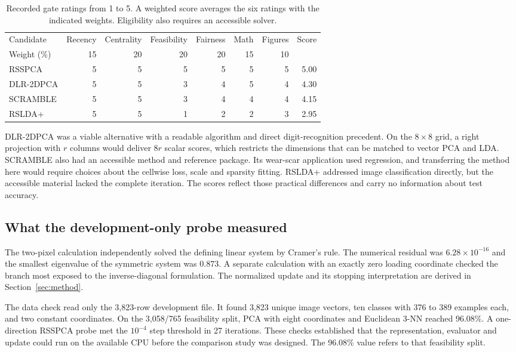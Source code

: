 \documentclass[11pt,a4paper]{article}
\begin{document}
\begin{table}[H]\small\centering
\caption{Recorded gate ratings from 1 to 5. A weighted score averages the six ratings with the indicated weights. Eligibility also requires an accessible solver.}
\label{tab:gate-scores}
\setlength{\tabcolsep}{5pt}
\begin{tabular}{@{}lrrrrrrr@{}}
\toprule
Candidate & Recency & Centrality & Feasibility & Fairness & Math & Figures & Score\\
Weight (\%) & 15 & 20 & 20 & 20 & 15 & 10 & \\
\midrule
RSSPCA & 5 & 5 & 5 & 5 & 5 & 5 & 5.00\\
DLR-2DPCA & 5 & 5 & 3 & 4 & 5 & 4 & 4.30\\
SCRAMBLE & 5 & 5 & 3 & 4 & 4 & 4 & 4.15\\
RSLDA+ & 5 & 5 & 1 & 2 & 2 & 3 & 2.95\\
\bottomrule
\end{tabular}
\end{table}

DLR-2DPCA was a viable alternative with a readable algorithm and direct digit-recognition precedent. On the $8\times8$ grid, a right projection with $r$ columns would deliver $8r$ scalar scores, which restricts the dimensions that can be matched to vector PCA and LDA. SCRAMBLE also had an accessible method and reference package. Its wear-scar application used regression, and transferring the method here would require choices about the cellwise loss, scale and sparsity fitting. RSLDA+ addressed image classification directly, but the accessible material lacked the complete iteration. The scores reflect those practical differences and carry no information about test accuracy.

\subsection{What the development-only probe measured}

The two-pixel calculation independently solved the defining linear system by Cramer's rule. The numerical residual was $6.28\times10^{-16}$ and the smallest eigenvalue of the symmetric system was $0.873$. A separate calculation with an exactly zero loading coordinate checked the branch most exposed to the inverse-diagonal formulation. The normalized update and its stopping interpretation are derived in Section~\ref{sec:method}.

The data check read only the 3,823-row development file. It found 3,823 unique image vectors, ten classes with 376 to 389 examples each, and two constant coordinates. On the 3,058/765 feasibility split, PCA with eight coordinates and Euclidean 3-NN reached 96.08\%. A one-direction RSSPCA probe met the $10^{-4}$ step threshold in 27 iterations. These checks established that the representation, evaluator and update could run on the available CPU before the comparison study was designed. The 96.08\% value refers to that feasibility split.
\end{document}
